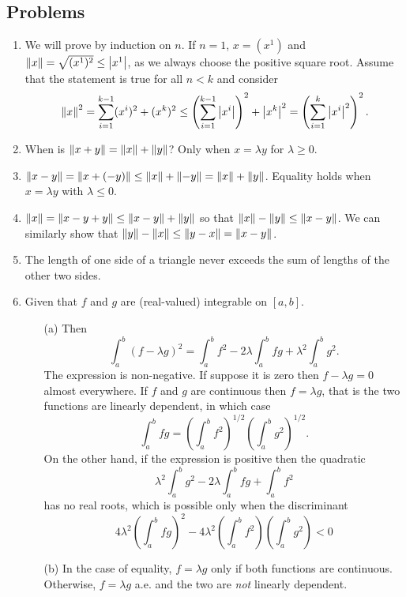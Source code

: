 \subsection{Problems}
\begin{enumerate}
\item We will prove by induction on $n$. If $n = 1$, $x = (x^1)$ and $\left\Vert{x}\right\Vert
= \sqrt{(x^1)^2} \le \left\vert{x^1}\right\vert$, as we always choose the positive square root.
Assume that the statement is true for all $n < k$ and consider
\[
\left\Vert{x}\right\Vert^2 = \sum_{i=1}^{k-1}(x^i)^2 + (x^k)^2 \le 
\left(\sum_{i=1}^{k-1}\left\vert{x^i}\right\vert\right)^2 + \left\vert{x^k}\right\vert^2 = 
\left(\sum_{i=1}^k\left\vert{x^i}\right\vert^2\right)^2.
\]

\item When is $\left\Vert{x + y}\right\Vert = \left\Vert{x}\right\Vert + \left\Vert{y}\right\Vert$? Only when $x = \lambda y$ 
for $\lambda \ge 0$.

\item $\left\Vert{x - y}\right\Vert = \left\Vert{x + (-y)}\right\Vert \le \left\Vert{x}\right\Vert + \left\Vert{-y}\right\Vert = \left\Vert{x}\right\Vert + 
\left\Vert{y}\right\Vert$. Equality holds when $x = \lambda y$ with $\lambda \le 0$.

\item $\left\Vert{x}\right\Vert = \left\Vert{x - y + y}\right\Vert \le \left\Vert{x - y}\right\Vert + \left\Vert{y}\right\Vert$ so that
$\left\Vert{x}\right\Vert - \left\Vert{y}\right\Vert \le \left\Vert{x - y}\right\Vert$. We can similarly show that $\left\Vert{y}\right\Vert -
\left\Vert{x}\right\Vert \le \left\Vert{y - x}\right\Vert = \left\Vert{x - y}\right\Vert$.

\item The length of one side of a triangle never exceeds the sum of lengths of
the other two sides.

\item Given that $f$ and $g$ are (real-valued) integrable on $[a, b]$. 
\begin{enumerate}
\item[(a)] Then
\[
\int_a^b (f - \lambda g)^2 = \int_a^b f^2 - 2\lambda\int_a^b fg + \lambda^2
\int_a^b g^2.
\]
The expression is non-negative. If suppose it is zero then $f - \lambda g = 0$
almost everywhere. If $f$ and $g$ are continuous then $f = \lambda g$, that is
the two functions are linearly dependent, in which case
\[
\int_a^b fg = \left(\int_a^b f^2\right)^{1/2}\left(\int_a^b g^2\right)^{1/2}.
\]
On the other hand, if the expression
is positive then the quadratic
\[
\lambda^2 \int_a^b g^2 - 2\lambda\int_a^b fg + \int_a^b f^2
\]
has no real roots, which is possible only when the discriminant
\[
4\lambda^2 \left(\int_a^b fg\right)^2 - 
4\lambda^2\left(\int_a^b f^2\right)\left(\int_a^b g^2\right) < 0
\]

\item[(b)] In the case of equality, $f = \lambda g$ only if both functions are
continuous. Otherwise, $f = \lambda g$ a.e. and the two are \emph{not} linearly
dependent.


\end{enumerate}
\end{enumerate}
